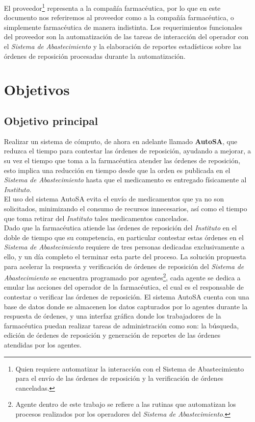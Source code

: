 El proveedor\footnote{Quien requiere automatizar la interacción con el Sistema de Abastecimiento para el envío de las órdenes de reposición y la verificación de órdenes canceladas.} representa a la compañía farmacéutica, por lo que en este documento nos referiremos al proveedor como a la compañía farmacéutica, o simplemente farmacéutica de manera indistinta. Los requerimientos funcionales del proveedor son la automatización de las tareas de interacción del operador con el \textit{Sistema de Abastecimiento} y la elaboración de reportes estadísticos sobre las órdenes de reposición procesadas durante la automatización.

\section{Objetivos}
\subsection{Objetivo principal}\label{sec:objetivo-principal}
Realizar un sistema de cómputo, de ahora en adelante llamado \textbf{AutoSA}, que reduzca el tiempo para contestar las órdenes de reposición, ayudando a mejorar, a su vez el tiempo que toma a la farmacéutica atender las órdenes de reposición, esto implica una reducción en tiempo desde que la orden es publicada en el \textit{Sistema de Abastecimiento} hasta que el medicamento es entregado físicamente al \textit{Instituto}.\\
El uso del sistema AutoSA evita el envío de medicamentos que ya no son solicitados, minimizando el consumo de recursos innecesarios, así como el tiempo que toma retirar del \textit{Instituto} tales medicamentos cancelados.\\
Dado que la farmacéutica atiende las órdenes de reposición del \textit{Instituto} en el doble de tiempo que su competencia, en particular contestar estas órdenes en el \textit{Sistema de Abastecimiento} requiere de tres personas dedicadas exclusivamente a ello, y un día completo el terminar esta parte del proceso. La solución propuesta para acelerar la respuesta y verificación de órdenes de reposición del \textit{Sistema de Abastecimiento} se encuentra programado por agentes\footnote{Agente dentro de este trabajo se refiere a las rutinas que automatizan los procesos realizados por los operadores del \textit{Sistema de Abastecimiento}.}, cada agente se dedica a emular las acciones del operador de la farmacéutica, el cual es el responsable de contestar o verificar las órdenes de reposición. El sistema AutoSA cuenta con una base de datos donde se almacenen los datos capturados por lo agentes durante la respuesta de órdenes, y una interfaz gráfica donde los trabajadores de la farmacéutica puedan realizar tareas de administración como son: la búsqueda, edición de órdenes de reposición y generación de reportes de las órdenes atendidas por los agentes.
